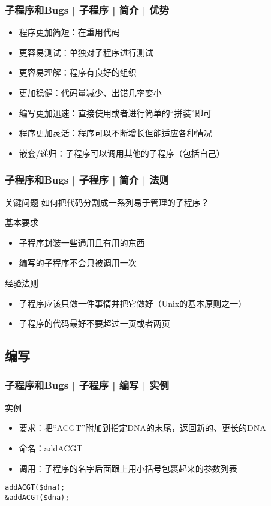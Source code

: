 \begin{frame}
  \frametitle{子程序和Bugs | 子程序 | 简介 | 优势}
  \begin{itemize}
    \item 程序更加简短：在重用代码
    \item 更容易测试：单独对子程序进行测试
    \item 更容易理解：程序有良好的组织
    \item 更加稳健：代码量减少、出错几率变小
    \item 编写更加迅速：直接使用或者进行简单的“拼装”即可
    \item 程序更加灵活：程序可以不断增长但能适应各种情况
    \item 嵌套/递归：子程序可以调用其他的子程序（包括自己）
  \end{itemize}
\end{frame}

\begin{frame}
  \frametitle{子程序和Bugs | 子程序 | 简介 | \alert{法则}}
  \begin{block}{关键问题}
    如何把代码分割成一系列易于管理的子程序？
  \end{block}
  \pause
  \begin{block}{基本要求}
    \begin{itemize}
      \item 子程序封装一些通用且有用的东西
      \item 编写的子程序不会只被调用一次 
    \end{itemize}
  \end{block}
  \pause
  \begin{block}{经验法则}
    \begin{itemize}
      \item 子程序应该只做一件事情并把它做好（Unix的基本原则之一）
      \item 子程序的代码最好不要超过一页或者两页
    \end{itemize}
  \end{block}
\end{frame}

\subsection{编写}
\begin{frame}[fragile]
  \frametitle{子程序和Bugs | 子程序 | 编写 | 实例}
  \begin{block}{实例}
    \begin{itemize}
      \item 要求：把“ACGT”附加到指定DNA的末尾，返回新的、更长的DNA
      \item 命名：addACGT
      \item \alert{调用}：子程序的名字后面跟上用小括号包裹起来的参数列表
    \end{itemize}
  \end{block}
  \pause
\begin{lstlisting}
addACGT($dna);
&addACGT($dna);
\end{lstlisting}
\end{frame}


